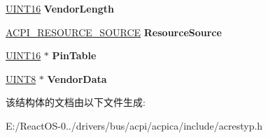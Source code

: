 \begin{DoxyCompactItemize}
\mbox{\label{structacpi__resource__pin__config_aa2b9374d8ac10eaa8f7cfeb27f6de2be}} 
\hyperlink{_processor_bind_8h_a09f1a1fb2293e33483cc8d44aefb1eb1}{U\+I\+N\+T16} {\bfseries Vendor\+Length}
\item 
\mbox{\label{structacpi__resource__pin__config_a7460e8f9c31cd8486f5dfa4764c8edd0}} 
\hyperlink{structacpi__resource__source}{A\+C\+P\+I\+\_\+\+R\+E\+S\+O\+U\+R\+C\+E\+\_\+\+S\+O\+U\+R\+CE} {\bfseries Resource\+Source}
\item 
\mbox{\label{structacpi__resource__pin__config_ae29184d526137ff6ee21064f93d78498}} 
\hyperlink{_processor_bind_8h_a09f1a1fb2293e33483cc8d44aefb1eb1}{U\+I\+N\+T16} $\ast$ {\bfseries Pin\+Table}
\item 
\mbox{\label{structacpi__resource__pin__config_ae81b111599ea57359f3af8842672354c}} 
\hyperlink{_processor_bind_8h_ab27e9918b538ce9d8ca692479b375b6a}{U\+I\+N\+T8} $\ast$ {\bfseries Vendor\+Data}
\end{DoxyCompactItemize}


该结构体的文档由以下文件生成\+:\begin{DoxyCompactItemize}
\item 
E\+:/\+React\+O\+S-\/0../drivers/bus/acpi/acpica/include/acrestyp.\+h\end{DoxyCompactItemize}
